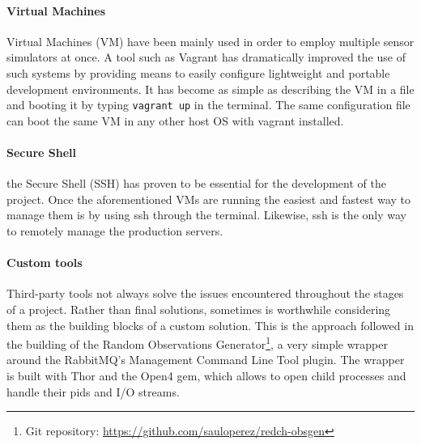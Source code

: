 \paragraph{Virtual Machines} Virtual Machines (VM) have been mainly used in order to employ multiple sensor simulators at once. A tool such as Vagrant has dramatically improved the use of such systems by providing means to easily configure lightweight and portable development environments. It has become as simple as describing the VM in a file and booting it by typing \texttt{vagrant up} in the terminal. The same configuration file can boot the same VM in any other host OS with vagrant installed.


\paragraph{Secure Shell} the Secure Shell (SSH) has proven to be essential for the development of the project. Once the aforementioned VMs are running the easiest and fastest way to manage them is by using ssh through the terminal. Likewise, ssh is the only way to remotely manage the production servers.

\paragraph{Custom tools} Third-party tools not always solve the issues encountered throughout the stages of a project. Rather than final solutions, sometimes is worthwhile considering them as the building blocks of a custom solution. This is the approach followed in the building of the Random Observations Generator\footnote{Git repository: \url{https://github.com/sauloperez/redch-obsgen}}, a very simple wrapper around the RabbitMQ's Management Command Line Tool plugin. The wrapper is built with Thor and the Open4 gem, which allows to open child processes and handle their pids and I/O streams.

